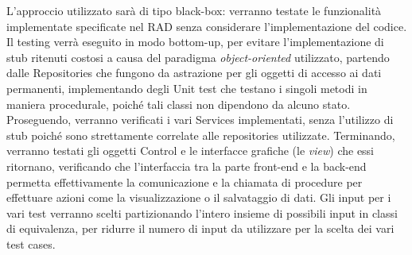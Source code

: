 L'approccio utilizzato sarà di tipo black-box: verranno testate le funzionalità implementate specificate nel RAD senza considerare l'implementazione del codice. Il testing verrà eseguito in modo bottom-up, per evitare l'implementazione di stub ritenuti costosi a causa del paradigma \emph{object-oriented} utilizzato, partendo dalle Repositories che fungono da astrazione per gli oggetti di accesso ai dati permanenti, implementando degli Unit test che testano i singoli metodi in maniera procedurale, poiché tali classi non dipendono da alcuno stato. Proseguendo, verranno verificati i vari Services implementati, senza l'utilizzo di stub poiché sono strettamente correlate alle repositories utilizzate. Terminando, verranno testati gli oggetti Control e le interfacce grafiche (le \emph{view}) che essi ritornano, verificando che l'interfaccia tra la parte front-end e la back-end permetta effettivamente la comunicazione e la chiamata di procedure per effettuare azioni come la visualizzazione o il salvataggio di dati. Gli input per i vari test verranno scelti partizionando l'intero insieme di possibili input in classi di equivalenza, per ridurre il numero di input da utilizzare per la scelta dei vari test cases.